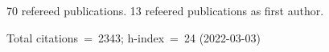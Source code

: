 70 refereed publications. 13 refeered publications as first author.

Total citations~=~2343; h-index~=~24 (2022-03-03)